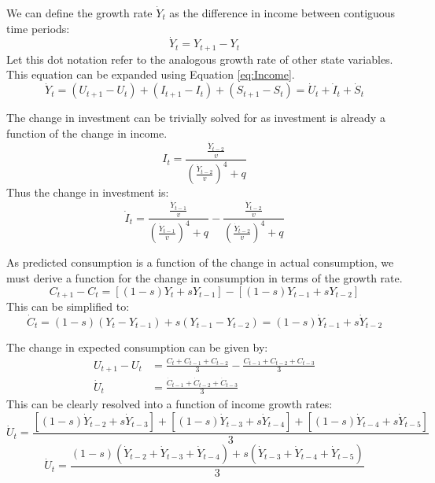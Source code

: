 We can define the growth rate $\dot Y_t$ as the difference in income between contiguous time periods:
\begin{equation}
    \dot Y_t=Y_{t+1}-Y_t
\end{equation}
Let this dot notation refer to the analogous growth rate of other state variables. This equation can be expanded using Equation \ref{eq:Income}.
\begin{equation*}
    \dot Y_t=(U_{t+1}-U_t)+(I_{t+1}-I_t)+(S_{t+1}-S_t)=\dot U_t+\dot I_t+\dot S_t
\end{equation*}

The change in investment can be trivially solved for as investment is already a function of the change in income.
\begin{equation*}
    I_t=\frac{\frac{\dot Y_{t-2}}{v}}{\left(\frac{\dot Y_{t-2}}{v}\right)^4+q}
\end{equation*}
Thus the change in investment is:
\begin{equation}
    \dot I_t=\frac{\frac{\dot Y_{t-1}}{v}}{\left(\frac{\dot Y_{t-1}}{v}\right)^4+q}-\frac{\frac{\dot Y_{t-2}}{v}}{\left(\frac{\dot Y_{t-2}}{v}\right)^4+q}
\end{equation}

As predicted consumption is a function of the change in actual consumption, we must derive a function for the change in consumption in terms of the growth rate.
\begin{equation*}
    C_{t+1}-C_t=[(1-s)Y_{t}+sY_{t-1}]-[(1-s)Y_{t-1}+sY_{t-2}]
\end{equation*}
This can be simplified to:
\begin{equation}
    \dot C_t=(1-s)(Y_{t}-Y_{t-1})+s(Y_{t-1}-Y_{t-2})=(1-s)\dot Y_{t-1} + s\dot Y_{t-2}
\end{equation}

The change in expected consumption can be given by:
\begin{align*}
    U_{t+1}-U_{t}&=\frac{C_{t}+C_{t-1}+C_{t-2}}{3}-\frac{C_{t-1}+C_{t-2}+C_{t-3}}{3}\\
    \dot U_t&=\frac{\dot C_{t-1}+\dot C_{t-2}+\dot C_{t-3}}{3}
\end{align*}
This can be clearly resolved into a function of income growth rates:
\begin{equation*}
    \dot U_t=\frac{[(1-s)\dot Y_{t-2} + s\dot Y_{t-3}]+[(1-s)\dot Y_{t-3} + s\dot Y_{t-4}]+[(1-s)\dot Y_{t-4} + s\dot Y_{t-5}]}{3}
\end{equation*}
\begin{equation}
    \dot U_t=\frac{(1-s)(\dot Y_{t-2}+\dot Y_{t-3}+\dot Y_{t-4})+s(\dot Y_{t-3}+\dot Y_{t-4}+\dot Y_{t-5})}{3}
\end{equation}

